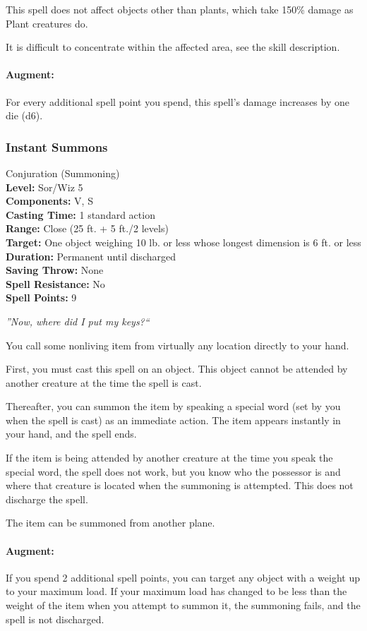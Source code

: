 This spell does not affect objects other than plants, which take 150\% damage as Plant creatures do.

It is difficult to concentrate within the affected area, see the  skill description.

\paragraph{Augment:} For every additional spell point you spend, this spell's damage increases by one die (d6).
\subsubsection{Instant Summons}
\label{Spell:InstantSummons}
Conjuration (Summoning)
\\ \textbf{Level:} Sor/Wiz 5
\\ \textbf{Components:} V, S
\\ \textbf{Casting Time:} 1 standard action
\\ \textbf{Range:} Close (25 ft. + 5 ft./2 levels)
\\ \textbf{Target:} One object weighing 10 lb. or less whose longest dimension is 6 ft. or less
\\ \textbf{Duration:} Permanent until discharged
\\ \textbf{Saving Throw:} None
\\ \textbf{Spell Resistance:} No
\\ \textbf{Spell Points:} 9

\emph{''Now, where did I put my keys?``}

You call some nonliving item from virtually any location directly to your hand.

First, you must cast this spell on an object.
This object cannot be attended by another creature at the time the spell is cast.

Thereafter, you can summon the item by speaking a special word (set by you when the spell is cast) as an immediate action. 
The item appears instantly in your hand, and the spell ends.

If the item is being attended by another creature at the time you speak the special word, the spell does not work, 
but you know who the possessor is and where that creature is located when the summoning is attempted.
This does not discharge the spell.

The item can be summoned from another plane.

\paragraph{Augment:} If you spend 2 additional spell points, you can target any object with a weight up to your maximum load.
If your maximum load has changed to be less than the weight of the item when you attempt to summon it, the summoning fails, 
and the spell is not discharged.
